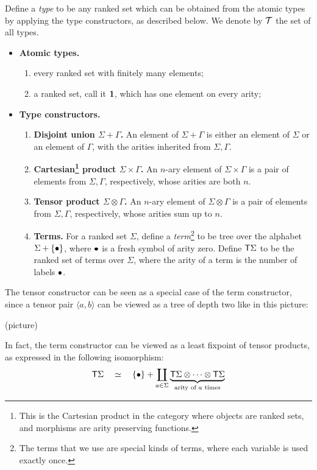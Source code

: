 \begin{definition}[Types]\label{def:types}
    Define a \emph{type} to be any ranked set which can be obtained from the atomic types by applying the type constructors, as described below. We denote by ${\mathcal T}$ the set of all types. 
    \begin{itemize}
        \item {\bf Atomic types.} 
           \begin{enumerate}
            \item every ranked set with finitely many elements;
            \item a ranked set, call it  $\mathbf{1}$, which has one element on every arity;
        \end{enumerate}
    \item {\bf Type constructors.} 
     \begin{enumerate}
        \item {\bf Disjoint union $\Sigma+\Gamma$.} An element of $\Sigma+\Gamma$ is either an element of $\Sigma$ or an element of $\Gamma$, with the arities inherited from $\Sigma,\Gamma$. 
        \item {\bf Cartesian\footnote{This is the Cartesian product in the category where objects are ranked sets, and morphisms are arity preserving functions.}  product $\Sigma \times \Gamma$.} An  $n$-ary element of $\Sigma \times \Gamma$ is a pair of elements from $\Sigma, \Gamma$, respectively, whose arities are both $n$.
        \item {\bf Tensor product $\Sigma \otimes \Gamma$.} An  $n$-ary element of $\Sigma \otimes \Gamma$ is a pair of elements from $\Sigma, \Gamma$, respectively, whose arities  sum up to $n$.
        \item {\bf Terms.} For a ranked set  $\Sigma$, define a \emph{term}\footnote{The terms that we use are special kinds of terms, where each variable is used exactly once.} to be tree over the alphabet $\Sigma + \{\bullet\}$, where $\bullet$ is a fresh symbol of arity zero. Define $\mathsf T \Sigma$ to be the ranked set of terms over $\Sigma$, where the arity of a term is the number of labels $\bullet$.
    \end{enumerate}  
    \end{itemize}  
\end{definition}

\newcommand{\tensorpair}[2]{\langle #1, #2 \rangle}

The tensor constructor can be seen as a special case of the term constructor, since a tensor pair $\tensorpair a b$  can be viewed as a tree of depth two like in this picture:
\begin{center}
    (picture)
\end{center}
In fact, the term constructor can be viewed as a least fixpoint of tensor products, as expressed in the following isomorphism:
\begin{align*}
    \mathsf T \Sigma \quad \simeq \quad  \{\bullet\} + \coprod_{a \in \Sigma} \underbrace{\mathsf T \Sigma \otimes \cdots \otimes \mathsf T \Sigma}_{\text{arity of $a$ times}}
\end{align*}

